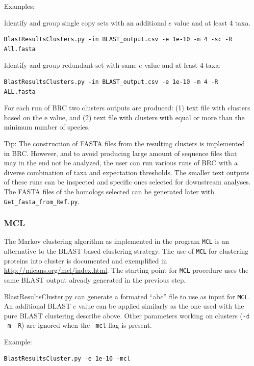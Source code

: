 \documentclass[10pt]{article}
\begin{document}
Examples:

Identify and group single copy sets with an additional $e$ value and at
least 4 taxa.

\begin{lstlisting}
BlastResultsClusters.py -in BLAST_output.csv -e 1e-10 -m 4 -sc -R All.fasta
\end{lstlisting}

Identify and group redundant set with same $e$ value and at least 4
taxa:

\begin{lstlisting} 
BlastResultsClusters.py -in BLAST_output.csv -e 1e-10 -m 4 -R ALL.fasta
\end{lstlisting}

For each run of BRC two clusters outputs are produced: (1) text file
with clusters based on the e value, and (2) text file with clusters
with equal or more than the minimum number of species.


Tip: The construction of FASTA files from the resulting clusters is
implemented in BRC. However, and to avoid producing large amount of
sequence files that may in the end not be analyzed, the user can run
various runs of BRC with a diverse combination of taxa and expectation
thresholds. The smaller text outputs of these runs can be inspected
and specific ones selected for downstream analyses. The FASTA files of
the homologs selected can be generated later with
\texttt{Get\_fasta\_from\_Ref.py}.

\subsubsection{MCL} The Markov clustering algorithm as implemented in
the program \texttt{MCL} is an alternative to the BLAST based clustering
strategy. The use of \texttt{MCL} for clustering proteins into cluster is
documented and exemplified in
\url{http://micans.org/mcl/index.html}. The starting point for \texttt{MCL}
procedure uses the same BLAST output already generated in the
previous step.


BlastResultsCluster.py can generate a formated ``abc'' file to use as
input for \texttt{MCL}.  An additional BLAST $e$ value can be applied similarly
as the one used with the pure BLAST clustering describe above. Other
parameters working on clusters (\texttt{-d -m -R}) are ignored when
the \texttt{-mcl} flag is present.

Example:
\begin{lstlisting} 
BlastResultsCluster.py -e 1e-10 -mcl
\end{lstlisting}
\end{document}
